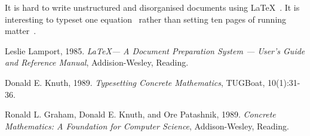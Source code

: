 \documentclass[12pt]{article}
\begin{document}
It  is    hard  to  write  unstructured  and  disorganised documents  using \LaTeX~\cite{les85}. It  is  interesting  to  typeset  one equation~\cite[Sec  3.3]{les85}  rather  than  setting  ten  pages  of running  matter~\cite{don89,rondon89}.

\begin{thebibliography}{9}

	Leslie  Lamport,  1985.  \emph{\LaTeX --- A  Document  Preparation System --- User’s  Guide  and Reference  Manual}, Addision-Wesley,  Reading.

	Donald  E.  Knuth,  1989.  \emph{Typesetting  Concrete Mathematics},  TUGBoat,  10(1):31-36.

	Ronald  L.  Graham,  Donald  E.  Knuth,  and  Ore Patashnik,  1989.  \emph{Concrete  Mathematics:  A  Foundation  for Computer  Science},  	Addison-Wesley,  Reading.

\end{thebibliography}
\end{document}
